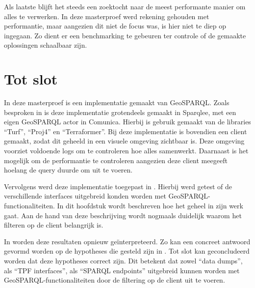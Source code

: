 Als laatste blijft het steeds een zoektocht naar de meest performante manier om alles te verwerken. In deze masterproef werd rekening gehouden met performantie, maar aangezien dit niet de focus was, is hier niet te diep op ingegaan. Zo dient er een benchmarking te gebeuren ter controle of de gemaakte oplossingen schaalbaar zijn.

\section{Tot slot}
In deze masterproef is een implementatie gemaakt van GeoSPARQL. Zoals besproken in  is deze implementatie grotendeels gemaakt in Sparqlee, met een eigen GeoSPARQL actor in Comunica. Hierbij is gebruik gemaakt van de libraries ``Turf'', ``Proj4'' en ``Terraformer''. Bij deze implementatie is bovendien een client gemaakt, zodat dit geheeld in een visuele omgeving zichtbaar is. Deze omgeving voorziet voldoende logs om te controleren hoe alles samenwerkt. Daarnaast is het mogelijk om de performantie te controleren aangezien deze client meegeeft hoelang de query duurde om uit te voeren. 

Vervolgens werd deze implementatie toegepast in . Hierbij werd getest of de verschillende interfaces uitgebreid konden worden met GeoSPARQL-functionaliteiten. In dit hoofdstuk wordt beschreven hoe het geheel in zijn werk gaat. Aan de hand van deze beschrijving wordt nogmaals duidelijk waarom het filteren op de client belangrijk is. 

In  worden deze resultaten opnieuw geïnterpreteerd. Zo kan een concreet antwoord gevormd worden op de hypotheses die gesteld zijn in . Tot slot kan geconcludeerd worden dat deze hypotheses correct zijn. Dit betekent dat zowel ``data dumps'', als ``TPF interfaces'', als ``SPARQL endpoints'' uitgebreid kunnen worden met GeoSPARQL-functionaliteiten door de filtering op de client uit te voeren.